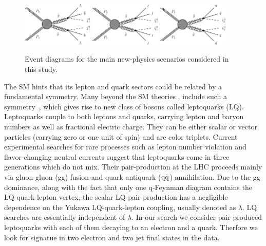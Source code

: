 \begin{figure}[h]
\centering
\includegraphics[width=0.3\textwidth]{T1bbbb.png}
\includegraphics[width=0.3\textwidth]{T1tttt.png}
\includegraphics[width=0.3\textwidth]{T1qqqq.png}

\caption{\label{fig:frog}Event diagrams for the main new-physics scenarios considered in this study.}
\end{figure}

The SM hints that its lepton and quark sectors could be
related by a fundamental symmetry. Many beyond the SM theories , include
such a symmetry~\cite{LQ1,LQ2,LQ3,LQ4}, which gives rise to new class of bosons called leptoquarks (LQ). Leptoquarks couple
to both leptons and quarks, carrying lepton and baryon numbers as well as fractional electric charge.
They can be either scalar or vector particles (carrying zero or one unit of spin) and are color
triplets. Current experimental searches for rare processes such as lepton number violation and
flavor-changing neutral currents suggest that leptoquarks come in three generations which do
not mix. Their pair-production at the LHC proceeds mainly via gluon-gluon (gg) fusion  and
quark antiquark ($\rm q\bar{q}$) annihilation. Due  to  the gg dominance,  along  with  the  fact  that  only  one q-Feynman  diagram
contains the LQ-quark-lepton vertex, the scalar LQ pair-production has a negligible dependence on the
Yukawa LQ-quark-lepton coupling, usually denoted as $\lambda$. LQ searches are essentially independent of $\lambda$. 
In our search we consider pair produced leptoquarks with each of them decaying to an electron and a quark. Therfore we look for signatue in two electron and two jet final states in the data.

